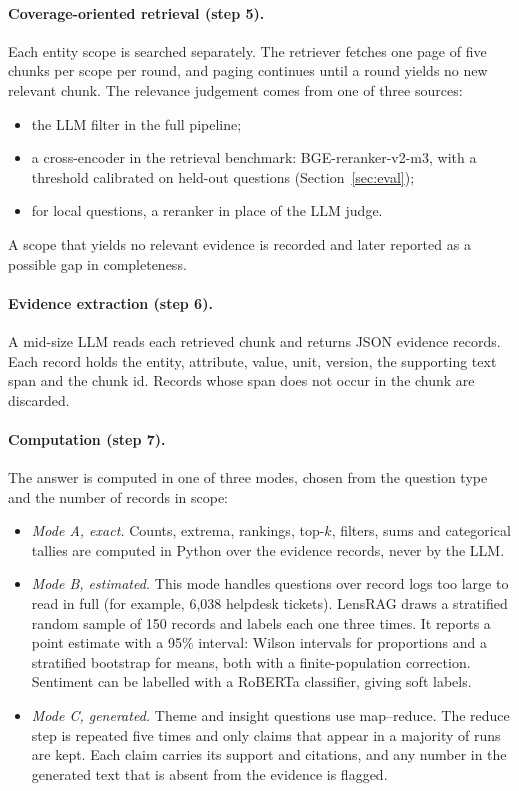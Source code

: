 \documentclass[11pt,letterpaper,oneside]{report}
\begin{document}
\paragraph{Coverage-oriented retrieval (step 5).}
Each entity scope is searched separately. The retriever fetches one page of
five chunks per scope per round, and paging continues until a round yields no
new relevant chunk. The relevance judgement comes from one of three sources:
\begin{itemize}
  \item the LLM filter in the full pipeline;
  \item a cross-encoder in the retrieval benchmark: BGE-reranker-v2-m3, with
  a threshold calibrated on held-out questions
  (Section~\ref{sec:eval});
  \item for local questions, a reranker in place of the LLM judge.
\end{itemize}
A scope that yields no relevant evidence is recorded and later reported as a
possible gap in completeness.

\paragraph{Evidence extraction (step 6).}
A mid-size LLM reads each retrieved chunk and returns JSON evidence records.
Each record holds the entity, attribute, value, unit, version, the supporting
text span and the chunk id. Records whose span does not occur in the chunk
are discarded.

\paragraph{Computation (step 7).}
The answer is computed in one of three modes, chosen from the question type
and the number of records in scope:
\begin{itemize}
  \item \emph{Mode A, exact.} Counts, extrema, rankings, top-$k$, filters,
  sums and categorical tallies are computed in Python over the evidence
  records, never by the LLM.
  \item \emph{Mode B, estimated.} This mode handles questions over record logs
  too large to read in full (for example, 6{,}038 helpdesk tickets). LensRAG
  draws a stratified random sample of 150 records and labels each one three
  times. It reports a point estimate with a 95\% interval: Wilson intervals
  for proportions and a stratified bootstrap for means, both with a
  finite-population correction. Sentiment can be labelled with a RoBERTa
  classifier, giving soft labels.
  \item \emph{Mode C, generated.} Theme and insight questions use map--reduce.
  The reduce step is repeated five times and only claims that appear in a
  majority of runs are kept. Each claim carries its support and citations,
  and any number in the generated text that is absent from the evidence is
  flagged.
\end{itemize}
\end{document}
